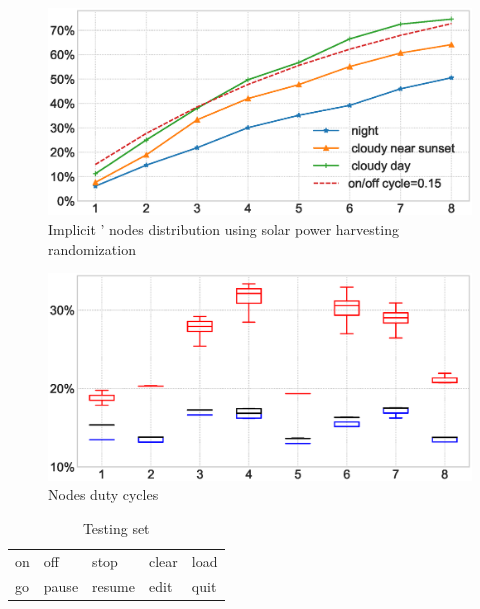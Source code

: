 \begin{figure}[t]
		\centering
		\includegraphics[width=\columnwidth]{figures/sysAvailability}
		\caption{Implicit \fullsys' nodes distribution using solar power harvesting randomization}
		\label{fig:solarPwrCoIS}
\end{figure} 
%
\begin{figure}[t]
		\centering
		\includegraphics[width=\columnwidth]{figures/sysDutyCycles}
		\caption{ Nodes duty cycles}
		\label{fig:sysDutyCycle}
\end{figure} 

\begin{table}[H]
\centering
\caption{Testing set}
\label{tab:words}
\begin{tabular}{lllll}
\hline
on    & off  & stop & clear & load   \\
go & pause & resume & edit  & quit  \\  
\hline  
\end{tabular}
\end{table}

